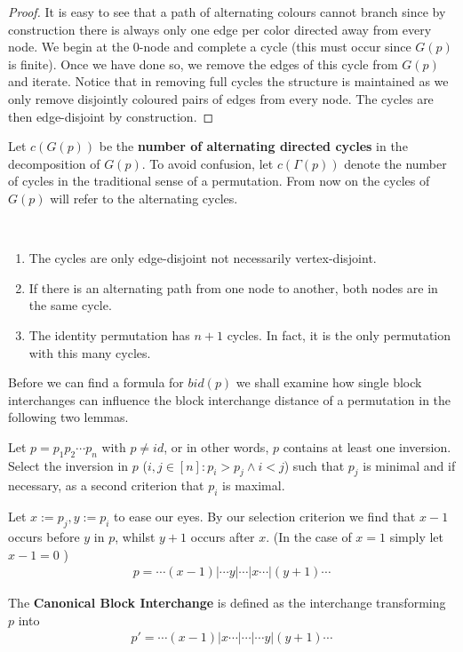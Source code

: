 \begin{proof}
It is easy to see that a path of alternating colours cannot branch since by construction there is always only one edge per color directed away from every node. We begin at the $0$-node and complete a cycle (this must occur since $G(p)$ is finite). Once we have done so, we remove the edges of this cycle from $G(p)$ and iterate. Notice that in removing full cycles the structure is maintained as we only remove disjointly coloured pairs of edges from every node. The cycles are then edge-disjoint by construction.
\end{proof}

\begin{definition}
Let $c(G(p))$ be the \textbf{number of alternating directed cycles} in the decomposition of $G(p)$. To avoid confusion, let $c(\Gamma (p))$ denote the number of cycles in the traditional sense of a permutation. From now on the cycles of $G(p)$ will refer to the alternating cycles.
\end{definition}

\begin{remark} ~ %
\begin{enumerate}
\item The cycles are only edge-disjoint not necessarily vertex-disjoint.
\item If there is an alternating path from one node to another, both nodes are in the same cycle.
\item The identity permutation has $n+1$ cycles. In fact, it is the only permutation with this many cycles.
\end{enumerate}
\end{remark}

Before we can find a formula for $bid(p)$ we shall examine how single block interchanges can influence the block interchange distance of a permutation in the following two lemmas.

\begin{definition} Let $p = p_1 p_2 \cdots p_n $ with $ p \neq id $, or in other words, $p$ contains at least one inversion. Select the inversion in $p$ ($ i,j \in [ n ] : p_i > p_j \wedge i < j$) such that $p_j$ is minimal and if necessary, as a second criterion that $p_i$ is maximal. 

Let $x := p_j , y := p_i$ to ease our eyes. By our selection criterion we find that $x-1$ occurs before $y$ in $p$, whilst $y+1$ occurs after $x$. (In the case of $x =1$ simply let $x-1=0$ )
\begin{align*}
p = \cdots (x-1) | \cdots y | \cdots | x \cdots | (y+1) \cdots
\end{align*}

The \textbf{Canonical Block Interchange} is defined as the interchange transforming $p$ into
\begin{align*}
p' = \cdots (x-1) | x \cdots | \cdots | \cdots y | (y+1) \cdots
\end{align*}

\end{definition}

